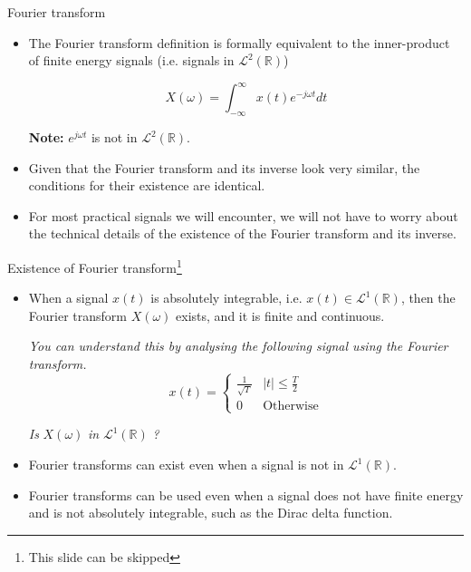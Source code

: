 \documentclass{beamer}
\begin{document}
\begin{frame}{Fourier transform}

\begin{itemize}
\item The Fourier transform definition is formally equivalent to the inner-product of finite energy signals (i.e. signals in $\mathcal{L}^2\left(\mathbb{R}\right)$)

\[ X(\omega) = \int_{-\infty}^{\infty}x(t)e^{-j\omega t}dt \]

\textbf{Note:} $e^{j\omega t}$ is not in $\mathcal{L}^2\left(\mathbb{R}\right)$.

\item Given that the Fourier transform and its inverse look very similar, the conditions for their existence are identical.

\item For most practical signals we will encounter, we will not have to worry about the technical details of the existence of the Fourier transform and its inverse.
\end{itemize}

\end{frame}

\begin{frame}{Existence of Fourier transform\footnote{This slide can be skipped}}

\begin{itemize}
\item When a signal $x(t)$ is absolutely integrable, i.e. $x(t) \in \mathcal{L}^{1}\left(\mathbb{R}\right)$, then the Fourier transform $X(\omega)$ exists, and it is finite and continuous. 

\textit{You can understand this by analysing the following signal using the Fourier transform.}
\[ x(t) = \begin{cases}
\frac{1}{\sqrt{T}} & \left|t\right| \leq \frac{T}{2} \\
0 & \text{Otherwise}
\end{cases} \]

\textit{Is} $X(\omega)$ \textit{in} $\mathcal{L}^1\left(\mathbb{R}\right)$ \textit{?}

\item Fourier transforms can exist even when a signal is not in $\mathcal{L}^1\left(\mathbb{R}\right)$.

\item Fourier transforms can be used even when a signal does not have finite energy and is not absolutely integrable, such as the Dirac delta function.

\end{itemize}

\end{frame}
\end{document}
